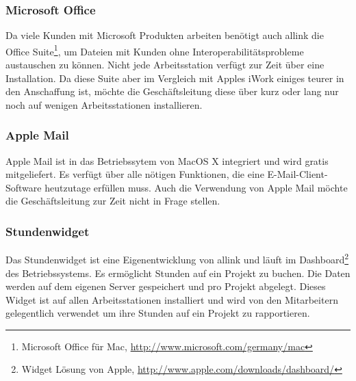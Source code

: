 \subsubsection{Microsoft Office}
Da viele Kunden mit Microsoft Produkten arbeiten benötigt auch allink die
Office Suite\footnote{Microsoft Office für Mac, \url{http://www.microsoft.com/germany/mac}}, 
um Dateien mit Kunden ohne Interoperabilitätsprobleme austauschen zu können. 
Nicht jede Arbeitsstation verfügt zur Zeit über eine Installation. Da diese
Suite aber im Vergleich mit Apples iWork einiges teurer in den Anschaffung ist,
möchte die Geschäftsleitung diese über kurz oder lang nur noch auf wenigen
Arbeitsstationen installieren.

\subsubsection{Apple Mail}
Apple Mail ist in das Betriebssytem von MacOS X integriert und wird gratis
mitgeliefert. Es verfügt über alle nötigen Funktionen, die eine E-Mail-Client-Software
heutzutage erfüllen muss. Auch die Verwendung von Apple Mail möchte die Geschäftsleitung 
zur Zeit nicht in Frage stellen.

\subsubsection{Stundenwidget}
Das Stundenwidget ist eine Eigenentwicklung von allink und läuft
im Dashboard\footnote{Widget Lösung von Apple, \url{http://www.apple.com/downloads/dashboard/}}
des Betriebssystems. Es ermöglicht Stunden auf ein Projekt zu buchen.
Die Daten werden auf dem eigenen Server gespeichert und pro Projekt abgelegt. Dieses Widget ist auf allen
Arbeitsstationen installiert und wird von den Mitarbeitern gelegentlich verwendet
um ihre Stunden auf ein Projekt zu rapportieren.

